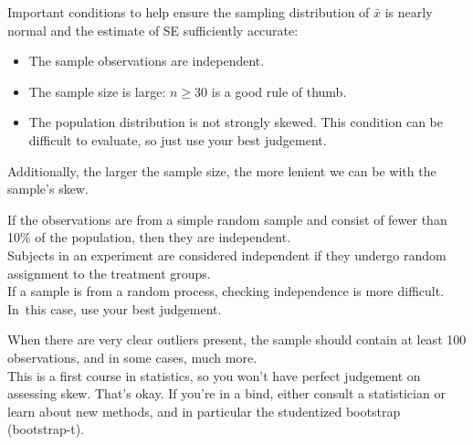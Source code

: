 \begin{termBox}{
Important conditions to help ensure the sampling distribution of $\bar{x}$ is nearly normal and the estimate of SE sufficiently accurate:
\begin{itemize}
\setlength{\itemsep}{0mm}
\item The sample observations are independent.
\item The sample size is large: $n\geq30$ is a good rule of thumb.
\item The population distribution is not strongly skewed. This condition can be difficult to evaluate, so just use your best judgement.
\end{itemize}
Additionally, the larger the sample size, the more lenient we can be with the sample's skew.}
\end{termBox}



\begin{tipBox}{
If the observations are from a simple random sample and consist of fewer than 10\% of the population, then they are independent.\\[2mm]
Subjects in an experiment are considered independent if they undergo random assignment to the treatment groups. \\[2mm]
If a sample is from a random process, checking independence is more difficult. In~this case, use your best judgement.}
\end{tipBox}

\begin{tipBox}{
When there are very clear outliers present, the sample should contain at least 100 observations, and in some cases, much more. \\[2mm]
This is a first course in statistics, so you won't have perfect judgement on assessing skew. That's okay. If you're in a bind, either consult a statistician or learn about new methods, and in particular the studentized bootstrap (bootstrap-t).}
\end{tipBox}

